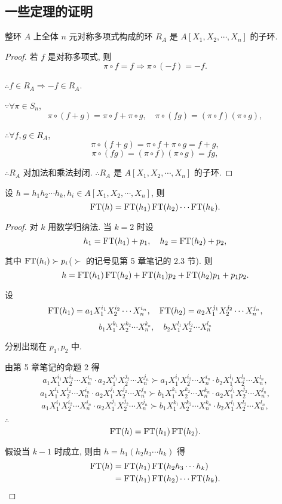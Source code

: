 \documentclass[color=black,device=normal,lang=cn,mode=geye]{elegantnote}
\begin{document}
\subsection{一些定理的证明}
\begin{theorem}
    整环 $A$ 上全体 $n$ 元对称多项式构成的环 $R_A$ 是 $A[X_1,X_2,\cdots,X_n]$ 的子环.
\end{theorem}
\begin{proof}
    若 $f$ 是对称多项式, 则
    \[\pi\circ f=f\Rightarrow\pi\circ(-f)=-f.\]

    $\therefore f\in R_A\Rightarrow-f\in R_A$.

    $\because\forall\pi\in S_n$,
    \[\pi\circ(f+g)=\pi\circ f+\pi\circ g,\quad\pi\circ(fg)=(\pi\circ f)(\pi\circ g),\]

    $\therefore\forall f,g\in R_A$,
    \[\pi\circ(f+g)=\pi\circ f+\pi\circ g=f+g,\]
    \[\pi\circ(fg)=(\pi\circ f)(\pi\circ g)=fg,\]

    $\therefore R_A$ 对加法和乘法封闭. $\therefore R_A$ 是 $A[X_1,X_2,\cdots,X_n]$ 的子环.
\end{proof}
\begin{theorem}[书上的引理 1]
    设 $h=h_1h_2\cdots h_k,h_i\in A[X_1,X_2,\cdots,X_n]$, 则
    \[\operatorname{FT} (h)=\operatorname{FT} (h_1)\operatorname{FT} (h_2)\cdots\operatorname{FT} (h_k).\]
\end{theorem}
\begin{proof}
    对 $k$ 用数学归纳法. 当 $k=2$ 时设
    \[h_1=\operatorname{FT} (h_1)+p_1,\quad h_2=\operatorname{FT} (h_2)+p_2,\]

    其中 $\operatorname{FT} (h_i)\succ p_i$($\succ$ 的记号见第 5 章笔记的 2.3 节). 则
    \[h=\operatorname{FT} (h_1)\operatorname{FT} (h_2)+\operatorname{FT} (h_1)p_2+\operatorname{FT} (h_2)p_1+p_1p_2.\]

    设
    \[\operatorname{FT} (h_1)=a_1X_1^{i_1}X_2^{i_2}\cdots X_n^{i_n},\quad\operatorname{FT} (h_2)=a_2X_1^{j_1}X_2^{j_2}\cdots X_n^{j_n},\]
    \[b_1X_1^{k_1}X_2^{k_2}\cdots X_n^{k_n},\quad b_2X_1^{l_1}X_2^{l_2}\cdots X_n^{l_n}\]

    分别出现在 $p_1,p_2$ 中.

    由第 5 章笔记的命题 2 得
    \[a_1X_1^{i_1}X_2^{i_2}\cdots X_n^{i_n}\cdot a_2X_1^{j_1}X_2^{j_2}\cdots X_n^{j_n}\succ a_1X_1^{i_1}X_2^{i_2}\cdots X_n^{i_n}\cdot b_2X_1^{l_1}X_2^{l_2}\cdots X_n^{l_n},\]
    \[a_1X_1^{i_1}X_2^{i_2}\cdots X_n^{i_n}\cdot a_2X_1^{j_1}X_2^{j_2}\cdots X_n^{j_n}\succ b_1X_1^{k_1}X_2^{k_2}\cdots X_n^{k_n}\cdot a_2X_1^{j_1}X_2^{j_2}\cdots X_n^{j_n},\]
    \[a_1X_1^{i_1}X_2^{i_2}\cdots X_n^{i_n}\cdot a_2X_1^{j_1}X_2^{j_2}\cdots X_n^{j_n}\succ b_1X_1^{k_1}X_2^{k_2}\cdots X_n^{k_n}\cdot b_2X_1^{l_1}X_2^{l_2}\cdots X_n^{l_n},\]

    $\therefore$
    \[\operatorname{FT} (h)=\operatorname{FT} (h_1)\operatorname{FT} (h_2).\]

    假设当 $k-1$ 时成立, 则由 $h=h_1(h_2h_3\cdots h_k)$ 得
    \begin{align*}
        \operatorname{FT} (h) & =\operatorname{FT} (h_1)\operatorname{FT} (h_2h_3\cdots h_k) \\
        & =\operatorname{FT} (h_1)\operatorname{FT} (h_2)\cdots\operatorname{FT} (h_k).\qedhere
    \end{align*}
\end{proof}
\end{document}
